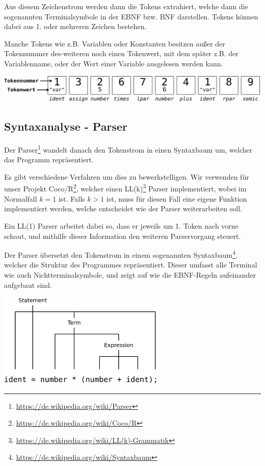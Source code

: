 
Aus diesem Zeichenstrom werden dann die Tokens extrahiert, welche dann die sogenannten Terminalsymbole in der EBNF bzw. BNF darstellen. Tokens k\"onnen dabei aus 1. oder mehreren Zeichen bestehen.

Manche Tokens wie z.B. Variablen oder Konstanten besitzen au\ss{}er der Tokennummer des-weiteren noch einen Tokenwert, mit dem sp\"ater z.B. der Variablenname, oder der Wert einer Variable ausgelesen werden kann.

\includegraphics[width=\textwidth]{./media/images/compiler/scanner_tokenstream.png}

\subsection{Syntaxanalyse - Parser}

Der Parser\footnote{\url{https://de.wikipedia.org/wiki/Parser}} wandelt danach den Tokenstrom in einen Syntaxbaum um, welcher das Programm repräsentiert.

Es gibt verschiedene Verfahren um dies zu bewerkstelligen. Wir verwenden f\"ur unser Projekt Coco/R\footnote{\url{https://de.wikipedia.org/wiki/Coco/R}}, welcher einen LL(k)\footnote{\url{https://de.wikipedia.org/wiki/LL(k)-Grammatik}} Parser implementiert, wobei im Normalfall $k = 1$ ist. Falls $k > 1$ ist, muss f\"ur diesen Fall eine eigene Funktion implementiert werden, welche entscheidet wie der Parser weiterarbeiten soll.

Ein LL(1) Parser arbeitet dabei so, dass er jeweils um 1. Token nach vorne schaut, und mithilfe dieser Information den weiteren Parservorgang steuert.


\newpage


Der Parser \"ubersetzt den Tokenstrom in einem sogenannten Syntaxbaum\footnote{\url{https://de.wikipedia.org/wiki/Syntaxbaum}}, welcher die Struktur des Programmes repr\"asentiert. Dieser umfasst alle Terminal wie auch Nichtterminalsymbole, und zeigt auf wie die EBNF-Regeln aufeinander aufgebaut sind.

\includegraphics[width=0.6\textwidth]{./media/images/compiler/parser_syntaxtree.png}

